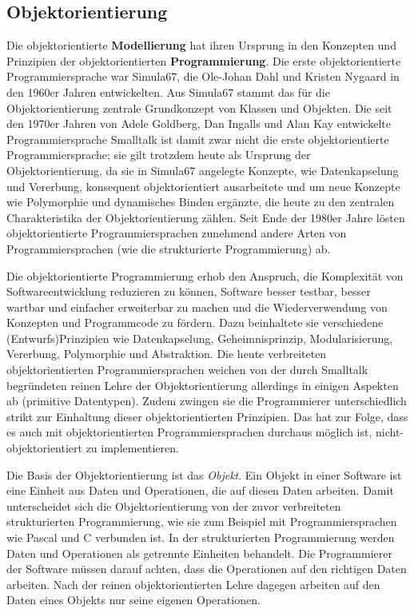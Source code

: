 \subsection{Objektorientierung}
\label{sec:Kap-3.2.1}

Die objektorientierte \textbf{Modellierung} hat ihren Ursprung in den Konzepten und Prinzipien der objektorientierten \textbf{Programmierung}. Die erste objektorientierte Programmiersprache war Simula67, die Ole-Johan Dahl und Kristen Nygaard in den 1960er Jahren entwickelten. Aus Simula67 stammt das für die Objektorientierung zentrale Grundkonzept von Klassen und Objekten. Die seit den 1970er Jahren von Adele Goldberg, Dan Ingalls und  Alan Kay entwickelte Programmiersprache Smalltalk \cite{gol83} ist damit zwar nicht die erste objektorientierte Programmiersprache; sie gilt trotzdem heute als Ursprung der Objektorientierung, da sie in Simula67 angelegte Konzepte, wie Datenkapselung und Vererbung, konsequent objektorientiert aus\-arbeitete und um neue Konzepte wie Polymorphie und dynamisches Binden ergänzte, die heute zu den zentralen Charakteristika der Objektorientierung zählen. Seit Ende der 1980er Jahre lösten objektorientierte Programmiersprachen zunehmend andere Arten von Programmiersprachen (wie die strukturierte Programmierung) ab. 

Die 
objektorientierte Programmierung erhob den Anspruch, die Komplexität von Softwareentwicklung reduzieren zu können, Software besser testbar, besser wartbar und einfacher erweiterbar zu machen und die Wiederverwendung von Konzepten und Programmcode zu fördern. Dazu beinhaltete sie verschiedene (Entwurfs)Prinzipien wie Datenkapselung, Geheimnisprinzip, Modularisierung, Vererbung, Polymorphie und Abstraktion. Die heute verbreiteten objektorientierten Programmiersprachen weichen von der durch Smalltalk begründeten reinen Lehre der Objektorientierung allerdings in einigen Aspekten ab (\zb primitive Datentypen). Zudem zwingen sie die Programmierer unterschiedlich strikt zur Einhaltung dieser objektorientierten Prinzipien. Das hat zur Folge, dass es auch mit objektorientierten Programmiersprachen durchaus möglich ist, nicht-objektorientiert zu implementieren. 

Die  Basis der Objektorientierung ist das \textit{Objekt}.
Ein Objekt in einer Software ist eine Einheit aus Daten und Operationen, die auf diesen Daten arbeiten. Damit unterscheidet sich die Objektorientierung von der zuvor verbreiteten strukturierten Programmierung, wie sie zum Beispiel mit Programmiersprachen wie Pascal und C verbunden ist. In der strukturierten Programmierung werden Daten und Operationen als getrennte Einheiten behandelt. Die Programmierer der Software müssen darauf achten, dass die Operationen auf den richtigen Daten arbeiten. Nach der reinen objektorientierten Lehre dagegen arbeiten auf den Daten eines Objekts nur seine eigenen Operationen. 

